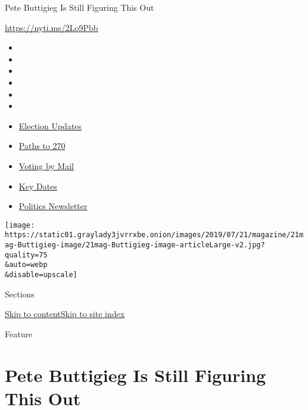Pete Buttigieg Is Still Figuring This Out

\url{https://nyti.ms/2Lo9Pbb}

\begin{itemize}
\item
\item
\item
\item
\item
\item
\end{itemize}

\begin{itemize}
\item
  \href{https://www.nytimes3xbfgragh.onion/live/2020/09/07/us/trump-vs-biden?action=click\&pgtype=Article\&state=default\&region=TOP_BANNER\&context=storylines_menu}{Election
  Updates}
\item
  \href{https://www.nytimes3xbfgragh.onion/interactive/2020/us/elections/election-states-biden-trump.html?action=click\&pgtype=Article\&state=default\&region=TOP_BANNER\&context=storylines_menu}{Paths
  to 270}
\item
  \href{https://www.nytimes3xbfgragh.onion/interactive/2020/08/31/us/politics/vote-by-mail-deadlines.html?action=click\&pgtype=Article\&state=default\&region=TOP_BANNER\&context=storylines_menu}{Voting
  by Mail}
\item
  \href{https://www.nytimes3xbfgragh.onion/interactive/2019/us/elections/2020-presidential-election-calendar.html?action=click\&pgtype=Article\&state=default\&region=TOP_BANNER\&context=storylines_menu}{Key
  Dates}
\item
  \href{https://www.nytimes3xbfgragh.onion/newsletters/politics?action=click\&pgtype=Article\&state=default\&region=TOP_BANNER\&context=storylines_menu}{Politics
  Newsletter}
\end{itemize}

\texttt{[image: https://static01.graylady3jvrrxbe.onion/images/2019/07/21/magazine/21mag-Buttigieg-image/21mag-Buttigieg-image-articleLarge-v2.jpg?quality=75\\\&auto=webp\\\&disable=upscale]}

Sections

\protect\hyperlink{site-content}{Skip to
content}\protect\hyperlink{site-index}{Skip to site index}

Feature

\hypertarget{pete-buttigieg-is-still-figuring-this-out}{%
\section{Pete Buttigieg Is Still Figuring This
Out}\label{pete-buttigieg-is-still-figuring-this-out}}

